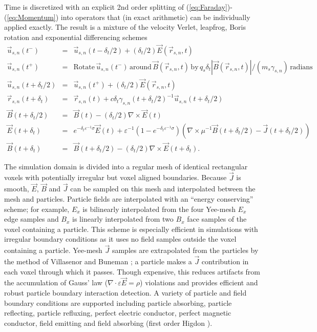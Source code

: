 \documentclass[10pt]{article}
\newcommand{\eps}{\varepsilon}
\newcommand{\vecr}{\vec{r}}
\newcommand{\vecu}{\vec{u}}
\newcommand{\vecJ}{\vec{J}}
\newcommand{\vecE}{\vec{E}}
\newcommand{\vecB}{\vec{B}}
\newcommand{\Div}[1]{\nabla \cdot #1}
\newcommand{\Curl}[1]{\nabla \times #1}
\newcommand{\eq}[1]{(\ref{eq:#1})}
\begin{document}
Time is discretized with an explicit 2nd order splitting of
\eq{Faraday}-\eq{Momentum} into operators that (in exact arithmetic)
can be individually applied exactly.  The result is a mixture of the
velocity Verlet, leapfrog, Boris rotation and exponential differencing
schemes
\begin{eqnarray}
\vecu_{s,n}\left(t^-\right) &=&\vecu_{s,n}\left(t-\delta_t/2\right) +
  \left(\delta_t/2\right)\vecE\left(\vecr_{s,n},t\right) \\
\vecu_{s,n}\left(t^+\right) &=&
  \textrm{Rotate}\,\vecu_{s,n}\left(t^-\right)\,\textrm{around}\,
  \vecB\left(\vecr_{s,n},t\right)\,\textrm{by}\,
  q_s\delta_t\left|\vecB\left(\vecr_{s,n},t\right)\right| /
  \left(m_s\gamma_{s,n}\right)\,\textrm{radians} \\
\vecu_{s,n}\left(t+\delta_t/2\right) &=&\vecu_{s,n}\left(t^+\right) +
  \left(\delta_t/2\right)\vecE\left(\vecr_{s,n},t\right) \\
\vecr_{s,n}\left(t+\delta_t\right) &=& \vecr_{s,n}\left(t\right) +
  c\delta_t\gamma_{s,n}\left(t+\delta_t/2\right)^{-1}
           \vecu_{s,n}\left(t+\delta_t/2\right) \\
\vecB\left(t+\delta_t/2\right) &=&
  \vecB\left(t\right) -
  \left(\delta_t/2\right)\Curl{\vecE\left(t\right)} \\
\vecE\left(t+\delta_t\right) &=&
  e^{-\delta_t\eps^{-1}\sigma}\vecE\left(t\right) +
  \eps^{-1}\left(1-e^{-\delta_t\eps^{-1}\sigma}\right)
    \left( \Curl{\mu^{-1}\vecB\left(t+\delta_t/2\right)} -
           \vecJ\left(t+\delta_t/2\right) \right) \\
\vecB\left(t+\delta_t\right) &=& \vecB\left(t+\delta_t/2\right) -
  \left(\delta_t/2\right)\Curl{\vecE\left(t+\delta_t\right)}
.
\end{eqnarray}

The simulation domain is divided into a regular mesh of identical
rectangular voxels with potentially irregular but voxel aligned
boundaries.  Because $\vecJ$ is smooth, $\vecE$, $\vecB$ and $\vecJ$
can be sampled on this mesh and interpolated between the mesh and
particles.  Particle fields are interpolated with an ``energy
conserving'' scheme; for example, $E_x$ is bilinearly interpolated
from the four Yee-mesh $E_x$ edge samples and $B_x$ is linearly
interpolated from two $B_x$ face samples of the voxel containing a
particle.  This scheme is especially efficient in simulations with
irregular boundary conditions as it uses no field samples outside the
voxel containing a particle.  Yee-mesh $\vecJ$ samples are
extrapolated from the particles by the method of Villasenor and
Buneman \cite{Villasenor_Buneman_1992}; a particle makes a $\vecJ$
contribution in each voxel through which it passes.  Though expensive,
this reduces artifacts from the accumulation of Gauss' law
($\Div{\eps\vecE}=\rho$) violations and provides efficient and robust
particle boundary interaction detection.  A variety of particle and
field boundary conditions are supported including particle absorbing,
particle reflecting, particle refluxing, perfect electric conductor,
perfect magnetic conductor, field emitting and field absorbing (first
order Higdon \cite{Higdon_1986}).
\end{document}
